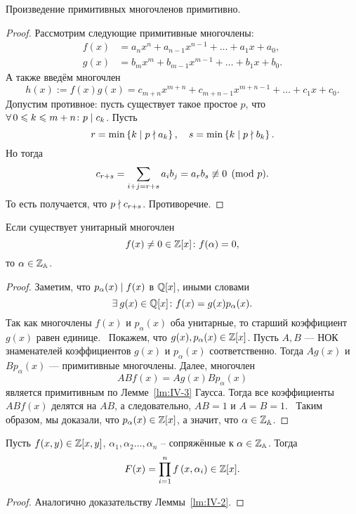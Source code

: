 \begin{nlemma}[Гаусса]
\label{lm:IV-3}
    Произведение примитивных многочленов примитивно.
\end{nlemma}
\begin{proof}
    Рассмотрим следующие примитивные многочлены:
    \begin{align*}
        f(x) &= a_nx^n + a_{n-1}x^{n-1} + \dots + a_1x + a_0, \\
        g(x) &= b_mx^m + b_{m-1}x^{m-1} + \dots + b_1x + b_0.
    \end{align*}
    А также введём многочлен
    \[
        h(x) := f(x)g(x) = c_{m+n}x^{m+n} + c_{m+n-1}x^{m+n-1} + \dots + c_1x + c_0.
    \]
    Допустим противное: пусть существует такое простое $p$, что $\forall 0 \le k \le m + n\colon p \divides c_k$. Пусть 
    \[
        r = \min\left\{k \mid p \nmid a_k\right\},
        \quad
        s = \min\left\{k \mid p \nmid b_k\right\}.
    \]
    Но тогда 
    \[
        c_{r+s} = \sum_{i+j=r+s} a_ib_j = a_rb_s \not\equiv 0 \pmod{p}.
    \]
    То есть получается, что $p \nmid c_{r+s}$. Противоречие.
\end{proof}

\begin{ntheorem}
\label{thm:IV-3}
    Если существует унитарный многочлен
    \[
        f(x) \ne 0 \in \mathbb{Z}[x]\colon f(\alpha) = 0,
    \]
    то $\alpha \in \mathbb{Z}_{\mathbb{A}}$.
\end{ntheorem}
\begin{proof}
    Заметим, что $p_{\alpha}(x) \mid f(x)$ в $\mathbb{Q}[x]$, иными словами
    \[
        \exists g(x) \in \QQ[x]\colon f(x) = g(x)p_{\alpha}(x).
    \]
    Так как многочлены $f(x)$ и $p_{\alpha}(x)$ оба унитарные, то старший коэффициент $g(x)$ равен единице.~\newline
    Покажем, что  $g(x), p_{\alpha}(x) \in \mathbb{Z}[x]$. Пусть $A, B$ --- НОК знаменателей коэффициентов $g(x)$ и $p_{\alpha}(x)$ соответственно. Тогда $Ag(x)$ и $Bp_{\alpha}(x)$ --- примитивные многочлены. Далее, многочлен
    \[
        ABf(x) = Ag(x)Bp_{\alpha}(x)
    \]
    является примитивным по Лемме~\ref{lm:IV-3} Гаусса. Тогда все коэффициенты $ABf(x)$ делятся на $AB$, а следовательно, $AB = 1$ и $A = B = 1$.~\newline
    Таким образом, мы доказали, что $p_{\alpha}(x) \in \mathbb{Z}[x]$, а значит, что $\alpha \in \mathbb{Z}_{\mathbb{A}}$.
\end{proof}

\begin{nlemma}
\label{lm:IV-4}
    Пусть $f(x, y) \in \mathbb{Z}[x, y]$, $\alpha_1, \alpha_2 \dots, \alpha_n$ -- сопряжённые к $\alpha \in \mathbb{Z}_{\mathbb{A}}$. Тогда
    \[
        F(x) = \prod_{i=1}^{n} f\left(x, \alpha_i\right) \in \mathbb{Z}[x].
    \]
\end{nlemma}
\begin{proof}
    Аналогично доказательству Леммы~\ref{lm:IV-2}.
\end{proof}

